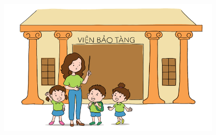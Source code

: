\begin{multicols}{2}
\begin{figure}[H]
		\includegraphics[width=1\linewidth]{Pi5_bai6}
		\vspace*{-15pt}
	\end{figure}
\end{multicols}
%
